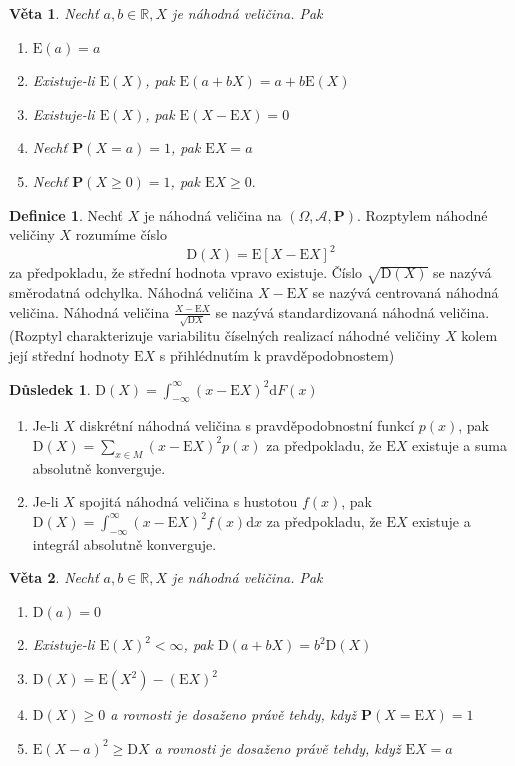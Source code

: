 \documentclass[a4]{report}
\newtheorem{theorem}{Věta}
\theoremstyle{definition}
\newtheorem{definition}{Definice}[section]
\newtheorem{dusledek}{Důsledek}[section]
\begin{document}
{\begin{theorem}
Nechť $a,b \in \mathbb{R},X$ je náhodná veličina. Pak
\begin{enumerate}
\item $\mathrm{E}(a)=a$
\item Existuje-li $\mathrm{E}(X)$, pak $\mathrm{E}(a+bX)=a+b\mathrm{E}(X)$
\item Existuje-li $\mathrm{E}(X)$, pak $\mathrm{E}(X-\mathrm{E}X)=0$
\item Nechť $\textbf{P}(X=a)=1$, pak $\mathrm{E}X=a$
\item Nechť $\textbf{P}(X\geq 0)=1$, pak $\mathrm{E}X\geq 0.$
\end{enumerate}
\end{theorem}

\begin{definition}
Nechť $X$ je náhodná veličina na $(\Omega,\mathcal{A},\textbf{P})$. Rozptylem náhodné veličiny $X$ rozumíme číslo 
\begin{equation}
\mathrm{D}(X)=\mathrm{E}[X-\mathrm{E} X]^2
\end{equation}
za předpokladu, že střední hodnota vpravo existuje. Číslo $\sqrt{\mathrm{D}(X)}$ se nazývá směrodatná odchylka. Náhodná veličina $X-\mathrm{E} X$ se nazývá centrovaná náhodná veličina. Náhodná veličina $\frac{X-\mathrm{E}X}{\sqrt{\mathrm{D}X}}$ se nazývá standardizovaná náhodná veličina. (Rozptyl charakterizuje variabilitu číselných realizací náhodné veličiny $X$ kolem její střední hodnoty $\mathrm{E}X$ s přihlédnutím k pravděpodobnostem)
\end{definition}

\begin{dusledek}
$\mathrm{D}(X)=\int_{-\infty}^{\infty}(x-\mathrm{E}X)^2\mathrm{d}F(x)$
\begin{enumerate}
\item Je-li $X$ diskrétní náhodná veličina s pravděpodobnostní funkcí $p(x)$, pak $\mathrm{D}(X)=\sum_{x\in M}(x-\mathrm{E}X)^2p(x)$ za předpokladu, že $\mathrm{E}X$ existuje a suma absolutně konverguje.
\item 
Je-li $X$ spojitá náhodná veličina s hustotou $f(x)$, pak $\mathrm{D}(X)=\int_{-\infty}^{\infty}(x-\mathrm{E}X)^2f(x)\mathrm{d}x$ za předpokladu, že $\mathrm{E}X$ existuje a integrál absolutně konverguje.
\end{enumerate}
\end{dusledek}

\begin{theorem}
Nechť $a,b \in \mathbb{R}, X$ je náhodná veličina. Pak
\begin{enumerate}
\item $\mathrm{D}(a)=0$
\item Existuje-li $\mathrm{E}(X)^2< \infty$, pak $\mathrm{D}(a+bX)=b^2\mathrm{D}(X)$
\item $\mathrm{D}(X)=\mathrm{E}(X^2)-(\mathrm{E}X)^2$
\item $\mathrm{D}(X)\geq 0$ a rovnosti je dosaženo právě tehdy, když $\textbf{P}(X=\mathrm{E}X)=1$
\item $\mathrm{E}(X-a)^2 \geq \mathrm{D}X$ a rovnosti je dosaženo právě tehdy, když $\mathrm{E}X=a$ 
\end{enumerate}
\end{theorem}

}
\end{document}

